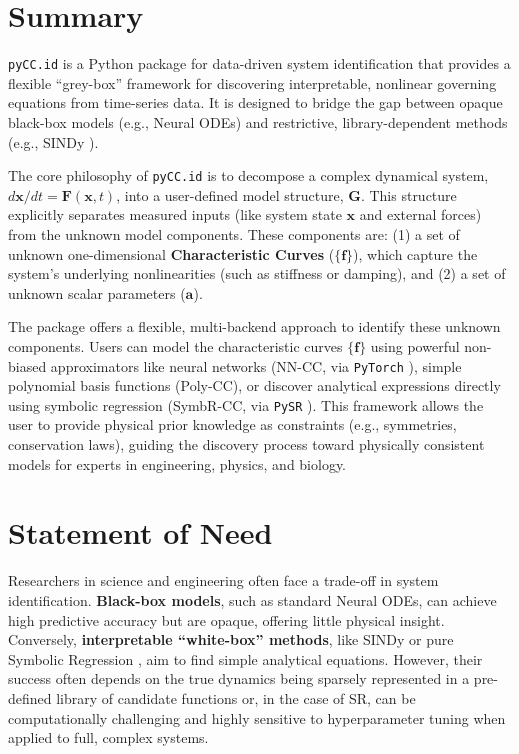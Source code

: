 \hypertarget{summary}{%
\section{Summary}\label{summary}}

\texttt{pyCC.id} is a Python package for data-driven system
identification that provides a flexible ``grey-box'' framework for
discovering interpretable, nonlinear governing equations from
time-series data. It is designed to bridge the gap between opaque
black-box models (e.g., Neural ODEs) and restrictive, library-dependent
methods (e.g., SINDy \autocite{Brunton2016}).

The core philosophy of \texttt{pyCC.id} is to decompose a complex
dynamical system, \(d\mathbf{x}/dt = \mathbf{F}(\mathbf{x}, t)\), into a
user-defined model structure, \(\mathbf{G}\). This structure explicitly
separates measured inputs (like system state \(\mathbf{x}\) and external
forces) from the unknown model components. These components are: (1) a
set of unknown one-dimensional \textbf{Characteristic Curves}
(\(\{\mathbf{f}\}\)), which capture the system's underlying
nonlinearities (such as stiffness or damping), and (2) a set of unknown
scalar parameters (\(\mathbf{a}\)).

The package offers a flexible, multi-backend approach to identify these
unknown components. Users can model the characteristic curves
\(\{\mathbf{f}\}\) using powerful non-biased approximators like neural
networks (NN-CC, via \texttt{PyTorch} \autocite{Paszke2019pytorch}),
simple polynomial basis functions (Poly-CC), or discover analytical
expressions directly using symbolic regression (SymbR-CC, via
\texttt{PySR} \autocite{Cranmer2023PySR}). This framework allows the
user to provide physical prior knowledge as constraints (e.g.,
symmetries, conservation laws), guiding the discovery process toward
physically consistent models for experts in engineering, physics, and
biology.

\hypertarget{statement-of-need}{%
\section{Statement of Need}\label{statement-of-need}}

Researchers in science and engineering often face a trade-off in system
identification. \textbf{Black-box models}, such as standard Neural ODEs,
can achieve high predictive accuracy but are opaque, offering little
physical insight. Conversely, \textbf{interpretable ``white-box''
methods}, like SINDy \autocite{Brunton2016} or pure Symbolic Regression
\autocite{Cranmer2023PySR}, aim to find simple analytical equations.
However, their success often depends on the true dynamics being sparsely
represented in a pre-defined library of candidate functions or, in the
case of SR, can be computationally challenging and highly sensitive to
hyperparameter tuning when applied to full, complex systems.

